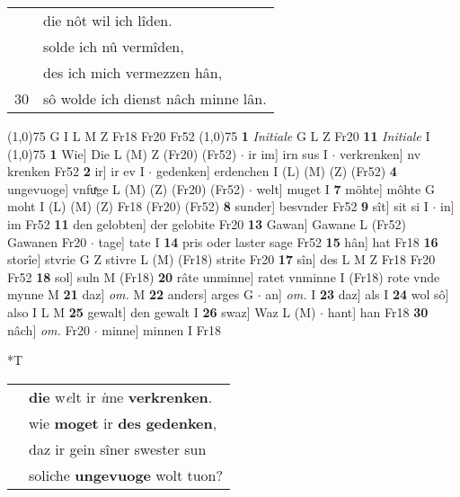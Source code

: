 \documentclass[8pt,a4paper,notitlepage]{article}
\begin{document}
\begin{table}[ht]
\begin{minipage}[t]{0.5\linewidth}
\begin{tabular}{rl}
 & die nôt wil ich lîden.\\ 
 & solde ich nû vermîden,\\ 
 & des ich mich vermezzen hân,\\ 
30 & sô wolde ich dienst nâch minne lân.\\ 
\end{tabular}
\scriptsize
\line(1,0){75} \newline
G I L M Z Fr18 Fr20 Fr52 \newline
\line(1,0){75} \newline
\textbf{1} \textit{Initiale} G L Z Fr20  \textbf{11} \textit{Initiale} I  \newline
\line(1,0){75} \newline
\textbf{1} Wie] Die L (M) Z (Fr20) (Fr52)  $\cdot$ ir im] irn sus I  $\cdot$ verkrenken] nv krenken Fr52 \textbf{2} ir] ir ev I  $\cdot$ gedenken] erdenchen I (L) (M) (Z) (Fr52) \textbf{4} ungevuoge] vnfuͯge L (M) (Z) (Fr20) (Fr52)  $\cdot$ welt] muget I \textbf{7} möhte] môhte G moht I (L) (M) (Z) Fr18 (Fr20) (Fr52) \textbf{8} sunder] besvnder Fr52 \textbf{9} sît] sit si I  $\cdot$ in] im Fr52 \textbf{11} den gelobten] der gelobite Fr20 \textbf{13} Gawan] Gawane L (Fr52) Gawanen Fr20  $\cdot$ tage] tate I \textbf{14} pris oder laster sage Fr52 \textbf{15} hân] hat Fr18 \textbf{16} storîe] stvrie G Z stivre L (M) (Fr18) strite Fr20 \textbf{17} sîn] des L M Z Fr18 Fr20 Fr52 \textbf{18} sol] suln M (Fr18) \textbf{20} râte unminne] ratet vnminne I (Fr18) rote vnde mynne M \textbf{21} daz] \textit{om.} M \textbf{22} anders] arges G  $\cdot$ an] \textit{om.} I \textbf{23} daz] als I \textbf{24} wol sô] also I L M \textbf{25} gewalt] den gewalt I \textbf{26} swaz] Waz L (M)  $\cdot$ hant] han Fr18 \textbf{30} nâch] \textit{om.} Fr20  $\cdot$ minne] minnen I Fr18 \newline
\end{minipage}
\hspace{0.5cm}
\begin{minipage}[t]{0.5\linewidth}
\small
\begin{center}*T
\end{center}
\begin{tabular}{rl}
 & \textbf{die} w\textit{e}lt ir \textit{i}me \textbf{verkrenken}.\\ 
 & wie \textbf{moget} ir \textbf{des} \textbf{gedenken},\\ 
 & daz ir gein sîner swester sun\\ 
 & soliche \textbf{ungevuoge} wolt tuon?\\ 

\end{tabular}
\end{minipage}
\end{table}
\end{document}
